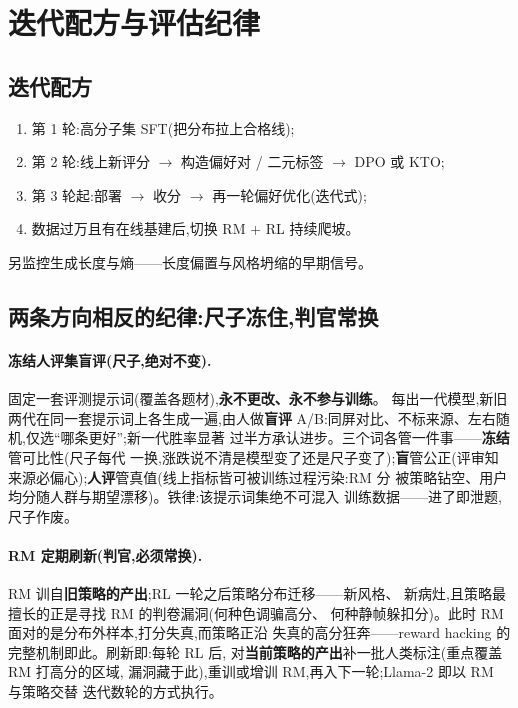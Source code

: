 \documentclass[UTF8, 11pt]{ctexart}
\begin{document}
\section{迭代配方与评估纪律}

\subsection{迭代配方}

\begin{enumerate}
  \item 第 1 轮:高分子集 SFT(把分布拉上合格线);
  \item 第 2 轮:线上新评分 $\to$ 构造偏好对 / 二元标签 $\to$ DPO 或 KTO;
  \item 第 3 轮起:部署 $\to$ 收分 $\to$ 再一轮偏好优化(迭代式);
  \item 数据过万且有在线基建后,切换 RM + RL 持续爬坡。
\end{enumerate}

另监控生成长度与熵——长度偏置与风格坍缩的早期信号。

\subsection{两条方向相反的纪律:尺子冻住,判官常换}

\paragraph{冻结人评集盲评(尺子,绝对不变).}
固定一套评测提示词(覆盖各题材),\textbf{永不更改、永不参与训练}。
每出一代模型,新旧两代在同一套提示词上各生成一遍,由人做\textbf{盲评}
A/B:同屏对比、不标来源、左右随机,仅选``哪条更好'';新一代胜率显著
过半方承认进步。三个词各管一件事——\textbf{冻结}管可比性(尺子每代
一换,涨跌说不清是模型变了还是尺子变了);\textbf{盲}管公正(评审知
来源必偏心);\textbf{人评}管真值(线上指标皆可被训练过程污染:RM 分
被策略钻空、用户均分随人群与期望漂移)。铁律:该提示词集绝不可混入
训练数据——进了即泄题,尺子作废。

\paragraph{RM 定期刷新(判官,必须常换).}
RM 训自\textbf{旧策略的产出};RL 一轮之后策略分布迁移——新风格、
新病灶,且策略最擅长的正是寻找 RM 的判卷漏洞(何种色调骗高分、
何种静帧躲扣分)。此时 RM 面对的是分布外样本,打分失真,而策略正沿
失真的高分狂奔——reward hacking 的完整机制即此。刷新即:每轮 RL 后,
对\textbf{当前策略的产出}补一批人类标注(重点覆盖 RM 打高分的区域,
漏洞藏于此),重训或增训 RM,再入下一轮;Llama-2 即以 RM 与策略交替
迭代数轮的方式执行。
\end{document}

